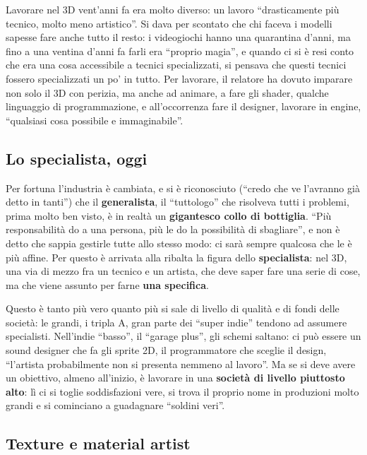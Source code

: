 Lavorare nel 3D vent'anni fa era molto diverso: un lavoro ``drasticamente più
tecnico, molto meno artistico''. Si dava per scontato che chi faceva i modelli
sapesse fare anche tutto il resto: i videogiochi hanno una quarantina d'anni,
ma fino a una ventina d'anni fa farli era ``proprio magia'', e quando ci si è
resi conto che era una cosa accessibile a tecnici specializzati, si pensava che
questi tecnici fossero specializzati un po' in tutto. Per lavorare, il
relatore ha dovuto imparare non solo il 3D con perizia, ma anche ad animare, a
fare gli shader, qualche linguaggio di programmazione, e all'occorrenza fare il
designer, lavorare in engine, ``qualsiasi cosa possibile e immaginabile''.

\subsection{Lo specialista, oggi}

Per fortuna l'industria è cambiata, e si è riconosciuto (``credo che ve
l'avranno già detto in tanti'') che il \textbf{generalista}, il ``tuttologo''
che risolveva tutti i problemi, prima molto ben visto, è in realtà un
\textbf{gigantesco collo di bottiglia}. ``Più responsabilità do a una persona,
più le do la possibilità di sbagliare'', e non è detto che sappia gestirle
tutte allo stesso modo: ci sarà sempre qualcosa che le è più affine. Per questo
è arrivata alla ribalta la figura dello \textbf{specialista}: nel 3D, una via
di mezzo fra un tecnico e un artista, che deve saper fare una serie di cose, ma
che viene assunto per farne \textbf{una specifica}.

Questo è tanto più vero quanto più si sale di livello di qualità e di fondi
delle società: le grandi, i tripla A, gran parte dei ``super indie'' tendono ad
assumere specialisti. Nell'indie ``basso'', il ``garage plus'', gli schemi
saltano: ci può essere un sound designer che fa gli sprite 2D, il programmatore
che sceglie il design, ``l'artista probabilmente non si presenta nemmeno al
lavoro''. Ma se si deve avere un obiettivo, almeno all'inizio, è lavorare in
una \textbf{società di livello piuttosto alto}: lì ci si toglie soddisfazioni
vere, si trova il proprio nome in produzioni molto grandi e si cominciano a
guadagnare ``soldini veri''.

\subsection{Texture e material artist}

